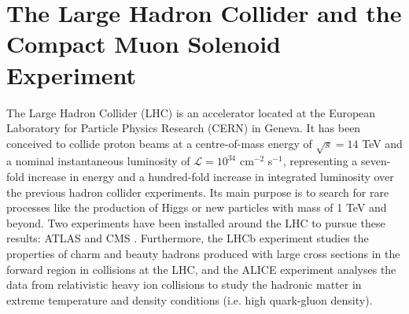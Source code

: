 \chapter[LHC and CMS detector]{The Large Hadron Collider and the Compact Muon Solenoid Experiment}
\label{sec:detect}

The Large Hadron Collider (LHC) \cite{LHC} is an accelerator located at the European Laboratory for Particle Physics Research (CERN) in Geneva. It has been conceived to collide proton beams at a centre-of-mass energy of $\sqrt{s} = 14$ TeV and
a nominal instantaneous luminosity of $\mathcal{L} = 10^{34}$ cm$^{-2}$ s$^{-1}$, representing a seven-fold increase in energy and a hundred-fold increase in integrated luminosity over the previous hadron collider experiments. Its main purpose is to search for rare processes like the production of Higgs or new particles with mass of 1 TeV and beyond. Two experiments have been installed around the LHC to pursue these results: ATLAS \cite{ATL} and CMS \cite{CMS}. Furthermore, the LHCb \cite{LHbr} experiment studies the properties of charm and beauty hadrons produced with large cross sections in the forward region in collisions at the LHC, and the ALICE \cite{ALI} experiment analyses the data from relativistic heavy ion collisions to study the hadronic matter in extreme temperature and density conditions (i.e. high quark-gluon density).

